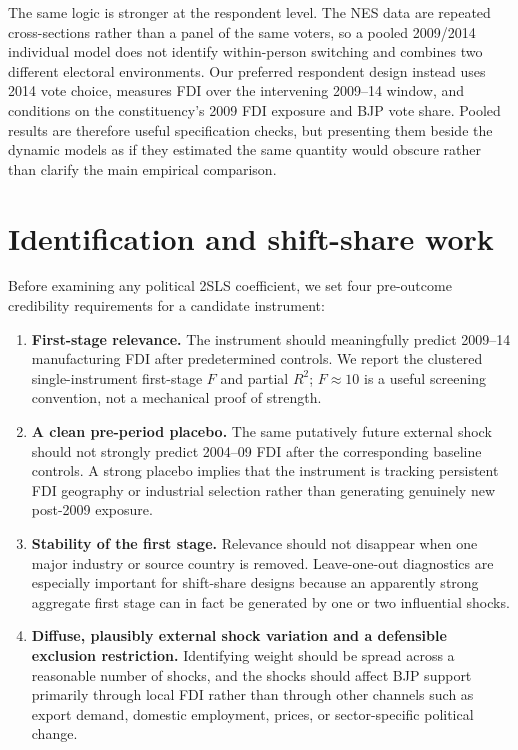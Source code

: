 \documentclass[11pt]{article}
\begin{document}
The same logic is stronger at the respondent level. The NES data are repeated cross-sections rather than a panel of the same voters, so a pooled 2009/2014 individual model does not identify within-person switching and combines two different electoral environments. Our preferred respondent design instead uses 2014 vote choice, measures FDI over the intervening 2009--14 window, and conditions on the constituency's 2009 FDI exposure and BJP vote share. Pooled results are therefore useful specification checks, but presenting them beside the dynamic models as if they estimated the same quantity would obscure rather than clarify the main empirical comparison.

\section*{Identification and shift-share work}

Before examining any political 2SLS coefficient, we set four pre-outcome credibility requirements for a candidate instrument:

\begin{enumerate}[label=(\roman*),leftmargin=2.3em]
\item \textbf{First-stage relevance.} The instrument should meaningfully predict 2009--14 manufacturing FDI after predetermined controls. We report the clustered single-instrument first-stage $F$ and partial $R^2$; $F\approx10$ is a useful screening convention, not a mechanical proof of strength.
\item \textbf{A clean pre-period placebo.} The same putatively future external shock should not strongly predict 2004--09 FDI after the corresponding baseline controls. A strong placebo implies that the instrument is tracking persistent FDI geography or industrial selection rather than generating genuinely new post-2009 exposure.
\item \textbf{Stability of the first stage.} Relevance should not disappear when one major industry or source country is removed. Leave-one-out diagnostics are especially important for shift-share designs because an apparently strong aggregate first stage can in fact be generated by one or two influential shocks.
\item \textbf{Diffuse, plausibly external shock variation and a defensible exclusion restriction.} Identifying weight should be spread across a reasonable number of shocks, and the shocks should affect BJP support primarily through local FDI rather than through other channels such as export demand, domestic employment, prices, or sector-specific political change.
\end{enumerate}
\end{document}
